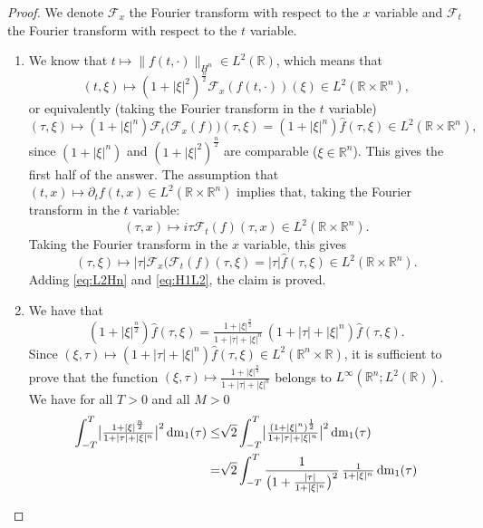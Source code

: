 \documentclass[a4paper, 12pt]{article}
\theoremstyle{plain}
\theoremstyle{definition}
\theoremstyle{remark}
\numberwithin{equation}{section}
\begin{document}
\begin{proof}
We denote ${\mathscr{F}}_x$ the Fourier transform with respect to the $x$ variable and ${\mathscr{F}}_t$ the Fourier transform with 
respect to the $t$ variable.
\begin{enumerate}
\item
We know that $t\mapsto \|f(t,\cdot)\|_{H^n} \in L^2({\mathds{R}})$, which means that
\[
(t,\xi)\mapsto (1+|\xi|^2)^{\frac{n}{2}}{\mathscr{F}}_x(f(t,\cdot))(\xi) \in L^2({\mathds{R}}\times {\mathds{R}}^n),
\]
or equivalently (taking the Fourier transform in the $t$ variable)
%
\begin{equation}
\label{eq:L2Hn}
(\tau,\xi)\mapsto (1+|\xi|^n){\mathscr{F}}_t\bigl({\mathscr{F}}_x(f)\bigr)(\tau,\xi) = (1+|\xi|^n)\hat{f}(\tau,\xi) \in L^2({\mathds{R}}\times {\mathds{R}}^n),
\end{equation}
%
since $(1+|\xi|^n)$ and $(1+|\xi|^2)^{\frac{n}{2}}$ are comparable ($\xi\in{\mathds{R}}^n$). This gives the first half of the answer.
The assumption that $(t,x)\mapsto \partial_tf(t,x) \in L^2({\mathds{R}}\times{\mathds{R}}^n)$ implies that, taking the Fourier transform
in the $t$ variable:
\[
(\tau,x)\mapsto i\tau {\mathscr{F}}_t(f)(\tau,x) \in L^2({\mathds{R}}\times{\mathds{R}}^n).
\]
Taking the Fourier transform in the $x$ variable, this gives
%
\begin{equation}
\label{eq:H1L2}
(\tau, \xi)\mapsto |\tau|{\mathscr{F}}_x({\mathscr{F}}_t(f)(\tau,\xi)=|\tau|\hat{f}(\tau,\xi) \in L^2({\mathds{R}}\times{\mathds{R}}^n).
\end{equation}
%
Adding \eqref{eq:L2Hn} and \eqref{eq:H1L2}, the claim is proved.
%
\item
We have that
\[
(1+|\xi|^{\frac{n}{2}})\hat{f}(\tau,\xi)=
\tfrac{1+|\xi|^{\frac{n}{2}}}{1+|\tau|+|\xi|^n}\, (1+|\tau|+|\xi|^n)\hat{f}(\tau,\xi).
\]
Since $(\xi,\tau)\mapsto(1+|\tau|+|\xi|^n)\hat{f}(\tau,\xi) \in L^2({\mathds{R}}^n\times{\mathds{R}})$, it is sufficient to prove that the function
$(\xi,\tau)\mapsto \frac{1+|\xi|^{\frac{n}{2}}}{1+|\tau|+|\xi|^n}$ belongs to $L^\infty({\mathds{R}}^n; L^2({\mathds{R}}))$.
We have for all $T>0$ and all $M>0$
%
\begin{align*}
\int_{-T}^T\bigl|\tfrac{1+|\xi|^{\frac{n}{2}}}{1+|\tau|+|\xi|^n}\bigr|^2\,{\rm dm}_1(\tau)
\le& \sqrt{2} \int_{-T}^T\bigl|\tfrac{(1+|\xi|^n)^{\frac{1}{2}}}{1+|\tau|+|\xi|^n}\bigr|^2\,{\rm dm}_1(\tau)\\
=& \sqrt{2} \int_{-T}^T\frac{1}{\bigl(1+\frac{|\tau|}{1+|\xi|^n}\bigr)^2}\,\tfrac{1}{1+|\xi|^n}\, 
{\rm dm}_1(\tau)\\

\end{align*}
\end{enumerate}
\end{proof}
\end{document}

